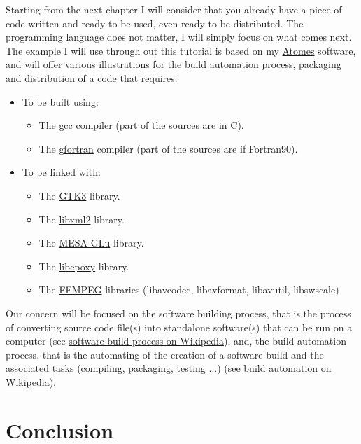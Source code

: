 \documentclass{./these-seb}
\begin{document}
Starting from the next chapter I will consider that you already have a piece of code written and ready to be used, even ready to be distributed. 
The programming language does not matter, I will simply focus on what comes next. \\[0.25cm]
The example I will use through out this tutorial is based on my \href{https://atomes.ipcms.fr}{Atomes} software, 
and will offer various illustrations for the build automation process, packaging and distribution of a code that requires: 
\begin{itemize}
\item To be built using:
\begin{itemize}
\item The \href{https://www.gnu.org/software/gcc/}{gcc} compiler (part of the sources are in C).
\item The \href{https://gcc.gnu.org/wiki/GFortran}{gfortran} compiler (part of the sources are if Fortran90).
\end{itemize}
\item To be linked with:
\begin{itemize}
\item The \href{https://www.gtk.org/}{GTK3} library.
\item The \href{http://xmlsoft.org/}{libxml2} library.
\item The \href{https://gitlab.freedesktop.org/mesa/glu}{MESA GLu} library.
\item The \href{https://github.com/anholt/libepoxy}{libepoxy} library.
\item The \href{https://ffmpeg.org}{FFMPEG} libraries (libavcodec, libavformat, libavutil, libswscale)
\end{itemize}
\end{itemize}
\vspace{0.25cm}
\noindent Our concern will be focused on the software building process, that is the process of converting source code file(s) into standalone software(s) 
that can be run on a computer (see \href{https://en.wikipedia.org/wiki/Software\_build}{software build process on Wikipedia}), and, 
the build automation process, that is the automating of the creation of a software build and the associated tasks (compiling, packaging, testing ...) (see \href{https://en.wikipedia.org/wiki/Build\_automation}{build automation on Wikipedia}).  






\chapter*{Conclusion}
\end{document}
